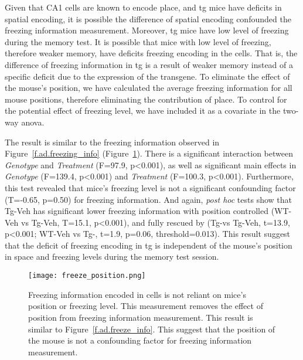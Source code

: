 Given that CA1 cells are known to encode place, and \gls{tg} mice have deficits in spatial encoding, it is possible the difference of spatial encoding confounded the freezing information measurement. Moreover, \gls{tg} mice have low level of freezing during the memory test. It is possible that mice with low level of freezing, therefore weaker memory, have deficits freezing encoding in the cells. That is, the difference of freezing information in \gls{tg} is a result of weaker memory instead of a specific deficit due to the expression of the transgene. To eliminate the effect of the mouse's position, we have calculated the average freezing information for all mouse positions, therefore eliminating the contribution of place. To control for the potential effect of freezing level, we have included it as a covariate in the two-way \gls{anova}. 

The result is similar to the freezing information observed in Figure~\ref{f.ad.freezing_info} (Figure~\ref{f.ad.freeze_ctrl}). There is a significant interaction between \textit{Genotype} and \textit{Treatment} (F=97.9, p<0.001), as well as significant main effects in \textit{Genotype} (F=139.4, p<0.001) and \textit{Treatment} (F=100.3, p<0.001). Furthermore, this test revealed that mice's freezing level is not a significant confounding factor (T=-0.65, p=0.50) for freezing information. And again, \textit{post hoc} tests show that Tg-Veh has significant lower freezing information with position controlled (WT-Veh vs Tg-Veh, T=15.1, p<0.001), and fully rescued by \tglu (Tg-\glu vs Tg-Veh, t=13.9, p<0.001; WT-Veh vs Tg-\glu, t=1.9, p=0.06, threshold=0.013). This result suggest that the deficit of freezing encoding in \gls{tg} is independent of the mouse's position in space and freezing levels during the memory test session.
\begin{figure}[h]
    \texttt{[image: freeze\_position.png]}
    \caption{Freezing information encoded in cells is not reliant on mice's position or freezing level. This measurement removes the effect of position from freezing information measurement. This result is similar to Figure~\ref{f.ad.freeze_info}. This suggest that the position of the mouse is not a confounding factor for freezing information measurement. \label{f.ad.freeze_ctrl}}
\end{figure}

